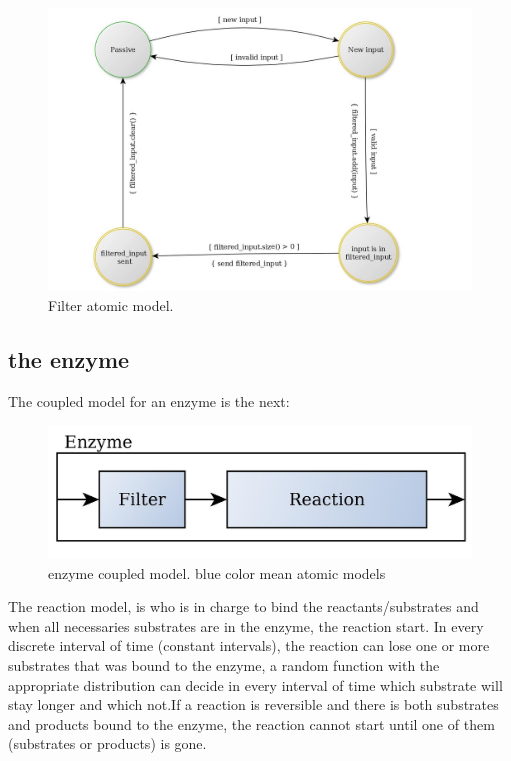 \documentclass[12pt]{article}
\begin{document}
\begin{figure}[h!]
 \centering
  \includegraphics[width=1\textwidth]{atomic-filter.jpg}
 \caption{Filter atomic model.}
\end{figure}

\newpage
\subsection*{the enzyme}
The coupled model for an enzyme is the next:

\begin{figure}[h!]
 \centering
  \includegraphics[width=1\textwidth]{coupled-enzyme.jpg}
 \caption{enzyme coupled model. blue color mean atomic models}
\end{figure}

\newpage

The reaction model, is who is in charge to bind the reactants/substrates and when all necessaries substrates are in the enzyme, the reaction start.
In every discrete interval of time (constant intervals), the reaction can lose one or more substrates that was bound to the enzyme, a random function with the appropriate distribution can decide in every interval of time which substrate will stay longer and which not.If a reaction is reversible and there is both substrates and products bound to the enzyme, the reaction cannot start until one of them (substrates or products) is gone.
\end{document}
